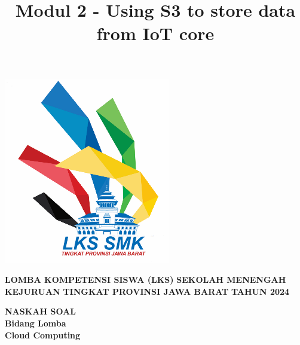 \documentclass{article}
\title{Modul 2 - Using S3 to store data from IoT core}
\author{}
\begin{document}
\lstset{language=Bash,upquote=true}
\begin{minipage}{0.2\textwidth}
  \includegraphics[width=\linewidth]{assets/logo_lks.png}
\end{minipage}
\hfill%
\begin{minipage}{0.75\textwidth}
  {\selectfont
    {\huge
    \textbf{LOMBA KOMPETENSI SISWA (LKS)}
    \vspace{4mm} 
    \textbf{SEKOLAH MENENGAH KEJURUAN}
    \vspace{4mm} 
    \textbf{TINGKAT PROVINSI JAWA BARAT}
    \vspace{4mm} 
    \textbf{TAHUN 2024}
    }
  }
\end{minipage}
\vspace{30mm} %
\begin{center}
  {\selectfont
    {\huge
      \textbf{NASKAH SOAL}\\
      \vspace{10mm} 
      \textbf{Bidang Lomba}\\
      \vspace{4mm} 
      \textbf{Cloud Computing}
    }
  }
\end{center}
{\let\newpage\relax\maketitle}
\end{document}
